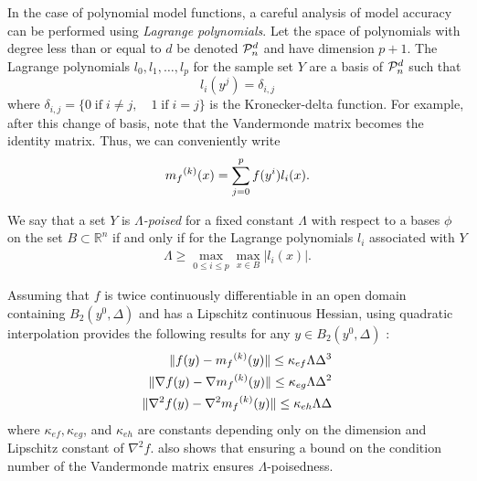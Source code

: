 In the case of polynomial model functions, a careful analysis of model accuracy can be performed using \emph{Lagrange polynomials}.
Let the space of polynomials with degree less than or equal to $d$ be denoted $\mathcal{P}^d_n$ and have dimension $p+1$.
The Lagrange polynomials $l_0, l_1, \ldots, l_p$ for the sample set $Y$ are a basis of $\mathcal{P}^d_n$ such that
\[
l_i(y^j) = \delta_{i,j}
\]
where $\delta_{i,j} = \{0 \;\text{if}\; i\ne j,\quad 1 \;\text{if} \; i = j \}$ is the Kronecker-delta function.
For example, after this change of basis, note that the Vandermonde matrix becomes the identity matrix.
Thus, we can conveniently write
\[
\label{reg}
{{m}_f}^{(k)}(x) = \sum^p_{j=0}f(y^i)l_i(x).
\]

We say that a set $Y$ is \emph{$\Lambda$-poised} for a fixed constant $\Lambda$ with respect to a bases $\phi$ on the set 
$B \subset \mathbb R^n$ if and only if for the Lagrange polynomials $l_i$ associated with $Y$
\begin{align}
\Lambda \ge \max_{0\le i\le p}\max_{x\in B}|l_i(x)|.
\end{align}


Assuming that $f$ is twice continuously differentiable in an open domain containing $B_2(y^0, \Delta)$ and has a Lipschitz continuous Hessian, using quadratic interpolation provides the following results for any $y \in B_2(y^0, \Delta)$ \cite{DUMMY:intro_book}:
\begin{align}
 \|f(y) - {{m}_f}^{(k)}(y)\| \le \kappa_{ef} \Lambda \Delta^3 \\
 \|\nabla f(y) - \nabla {{m}_f}^{(k)}(y)\| \le \kappa_{eg} \Lambda \Delta^2 \\
 \|\nabla^2 f(y) - \nabla^2 {{m}_f}^{(k)}(y)\| \le \kappa_{eh}\Lambda \Delta \\
\end{align}
where
$\kappa_{ef}, \kappa_{eg}$, and $\kappa_{eh}$ are constants depending only on the dimension and Lipschitz constant of $\nabla^2 f$.
\cite{DUMMY:intro_book} also shows that ensuring a bound on the condition number of the Vandermonde matrix ensures $\Lambda$-poisedness.

